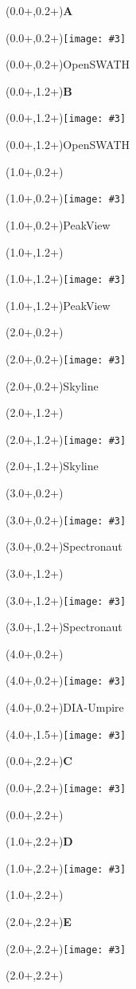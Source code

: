 \documentclass{article}
\newlength{\panelWidth} \newlength{\panelHeight}
\newlength{\labXshift} \newlength{\labYshift}
\newlength{\picXshift} \newlength{\picYshift}
\newlength{\txtXshift} \newlength{\txtYshift}
\newlength{\picWidth}
\newcommand{\txt}[3]{\begin{textblock*}{\panelWidth}(#1+\txtXshift,#2+\txtYshift){#3}\end{textblock*}}
\newcommand{\lab}[3]{\begin{textblock*}{\panelWidth}(#1+\labXshift,#2+\labYshift)\textbf{\LARGE #3}\end{textblock*}}
\newcommand{\pic}[3]{\begin{textblock*}{\panelWidth}(#1+\picXshift,#2+\picYshift)\texttt{[image: \#3]}\end{textblock*}}
\newcommand{\picVarWidth}[4]{\begin{textblock*}{\panelWidth}(#1+\picXshift,#2+\picYshift)\texttt{[image: \#3]}\end{textblock*}}
\newcommand{\fig}[5]{ \lab{#1}{#2}{#3} \pic{#1}{#2}{#4} \txt{#1}{#2}{#5} }
\newcommand{\figVarWidth}[6]{ \lab{#1}{#2}{#3} \picVarWidth{#1}{#2}{#4}{#6} \txt{#1}{#2}{#5} }
\begin{document}


\fig{0.0\panelWidth}{0.2\panelHeight}{A}{./OpenSWATH_peptides_r1.pdf}{OpenSWATH}
\fig{0.0\panelWidth}{1.2\panelHeight}{B}{./OpenSWATH_peptides_r2.pdf}{OpenSWATH}
\fig{1.0\panelWidth}{0.2\panelHeight}{}{./PeakView_peptides_r1.pdf}{PeakView}
\fig{1.0\panelWidth}{1.2\panelHeight}{}{./PeakView_peptides_r2.pdf}{PeakView}
\fig{2.0\panelWidth}{0.2\panelHeight}{}{./Skyline_peptides_r1.pdf}{Skyline}
\fig{2.0\panelWidth}{1.2\panelHeight}{}{./Skyline_peptides_r2.pdf}{Skyline}
\fig{3.0\panelWidth}{0.2\panelHeight}{}{./Spectronaut_peptides_r1.pdf}{Spectronaut}
\fig{3.0\panelWidth}{1.2\panelHeight}{}{./Spectronaut_peptides_r2.pdf}{Spectronaut}
\fig{4.0\panelWidth}{0.2\panelHeight}{}{./DIAumpire_peptides_r1.pdf}{DIA-Umpire}
\pic{4.0\panelWidth}{1.5\panelHeight}{./species_legend_v.pdf}

\fig{0.0\panelWidth}{2.2\panelHeight}{C}{./missing_values_peptides_r1.pdf}{}
\fig{1.0\panelWidth}{2.2\panelHeight}{D}{./missing_values_peptides_r2.pdf}{}
\figVarWidth{2.0\panelWidth}{2.2\panelHeight}{E}{./software_boxplots_low_intensity_range_peptides_ecoli.pdf}{}{1.3\picWidth}
\end{document}
